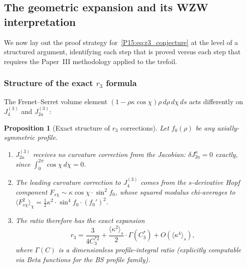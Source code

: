 \documentclass[11pt,a4paper]{article}
\newtheorem{proposition}[theorem]{Proposition}
\theoremstyle{definition}\newtheorem{definition}[theorem]{Definition}
\theoremstyle{remark}
\begin{document}
\subsection{The geometric expansion and its WZW interpretation}
\label{P15:sec:geom_expansion}

We now lay out the proof strategy for~\eqref{P15:eq:r3_conjecture}
at the level of a structured argument, identifying each step
that is proved versus each step that requires the Paper~III
methodology applied to the trefoil.

\subsubsection*{Structure of the exact $r_3$ formula}

The Frenet--Serret volume element $(1-\rho\kappa\cos\chi)\rho\,d\rho\,d\chi\,ds$
acts differently on $J_4^{(3)}$ and $J_{2a}^{(3)}$:

\begin{proposition}[Exact structure of $r_3$ corrections]
\label{P15:prop:r3_exact}
Let $f_0(\rho)$ be any axially-symmetric profile.
\begin{enumerate}[label=\textup{(\roman*)}]
\item $J_{2a}^{(3)}$ receives \emph{no} curvature correction from the
  Jacobian: $\delta J_{2a}^{\kappa} = 0$ exactly, since
  $\int_0^{2\pi}\cos\chi\,d\chi=0$.
\item The leading curvature correction to $J_4^{(3)}$ comes from
  the $s$-derivative Hopf component $F_{s\chi}\sim \kappa\cos\chi \cdot \sin^2\!f_0$,
  whose squared modulus chi-averages to
  $\langle F_{s\chi}^2\rangle_\chi = \tfrac12\kappa^2 \cdot \sin^4\!f_0 \cdot (f_0')^2$.
\item The ratio therefore has the exact expansion
  \begin{equation}
    r_3 = \frac{3}{4C_3^{*2}}
    + \frac{\langle\kappa^2\rangle_s}{2}\cdot\Gamma(C_3^*)
    + O(\langle\kappa^4\rangle_s),
    \label{P15:eq:r3_exact_expansion}
  \end{equation}
  where $\Gamma(C)$ is a dimensionless profile-integral ratio
  (explicitly computable via Beta functions for the BS profile family).
\end{enumerate}
\end{proposition}
\end{document}
